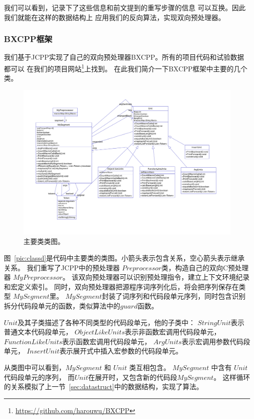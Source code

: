 我们可以看到，记录下了这些信息和前文提到的重写步骤的信息
可以互换。因此我们就能在这样的数据结构上
应用我们的反向算法，实现双向预处理器。


\subsubsection{BXCPP框架}
我们基于JCPP实现了自己的双向预处理器BXCPP。所有的项目代码和试验数据都可以
在我们的项目网站\footnote{\url{https://github.com/harouwu/BXCPP}}上找到。
在此我们简介一下BXCPP框架中主要的几个类。
\begin{figure}
\centering
\includegraphics[bb=0 0 1068 746,width=14cm]{pics/class.png}
\caption{主要类类图。}
\end{figure}
\label{pic:classd}

图~\ref{pic:classd}是代码中主要类的类图。小箭头表示包含关系，空心箭头表示继承关系。
我们重写了JCPP中的预处理器 $Preprocessor$类，构造自己的双向C预处理器 $MyPreprocessor$。
该双向预处理器可以识别预处理指令，建立上下文环境纪录和宏定义索引。
同时，双向预处理器把源程序词序列化后，将会把序列保存在类型 $MySegment$里。
$MySegment$封装了词序列和代码段单元序列，同时包含识别拆分代码段单元的函数，类似算法中的$guard$函数。


$Unit$及其子类描述了各种不同类型的代码段单元，他的子类中：
$StringUnit$表示普通文本代码段单元，
$ObjectLikeUnits$表示非函数宏调用代码段单元，
$FunctionLikeUnits$表示函数宏调用代码段单元，
$ArgUnits$表示宏调用参数代码段单元，
$InsertUnit$表示展开式中插入宏参数的代码段单元。

从类图中可以看到，$MySegment$ 和 $Unit$ 类互相包含。
$MySegment$ 中含有 $Unit$ 代码段单元的序列，
而$Unit$在展开时，又包含新的代码段$MySegment$。
这样循环的关系模拟了上一节~\ref{sec:datastruct}中的数据结构，实现了算法。

